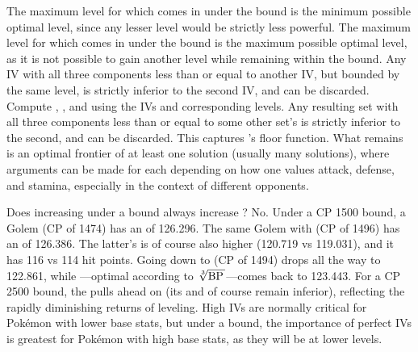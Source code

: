 The maximum level for which  comes in under the bound is the
 minimum possible optimal level, since any lesser level would be strictly less
 powerful.
The maximum level for which  comes in under the bound is the
 maximum possible optimal level, as it is not possible to gain another level
 while remaining within the bound.
Any IV with all three components less than or equal to another IV, but bounded
 by the same level, is strictly inferior to the second IV, and can be discarded.
Compute , , and \MHP{} using the IVs and corresponding levels.
Any resulting set with all three components less than or equal to some other set's
 is strictly inferior to the second, and can be discarded.
This captures \MHP{}'s floor function.
What remains is an optimal frontier of at least one solution (usually
 many solutions), where arguments can be made for each depending on how one
 values attack, defense, and stamina, especially in the context of different
 opponents.

Does increasing  under a bound always increase ? No.
Under a CP 1500 bound, a  Golem (CP of 1474) has an  of 126.296.
The same Golem with  (CP of 1496) has an  of 126.386.
The latter's  is of course also higher (120.719 vs 119.031), and it
 has 116 vs 114 hit points.
Going down to  (CP of 1494) drops all the way to 122.861,
 while ---optimal according to $\sqrt[3]{\mbox{BP}\,}$---comes back to 123.443.
For a CP 2500 bound, the  pulls ahead on  (its  and \MHP of course remain inferior),
 reflecting the rapidly diminishing returns of leveling.
High IVs are normally critical for Pokémon with lower base stats, but under a bound, the importance of perfect IVs
 is greatest for Pokémon with high base stats, as they will be at lower levels.

